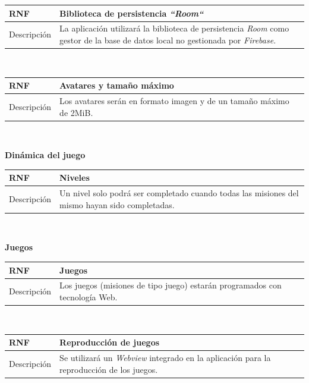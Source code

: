 \documentclass[twoside]{report}
\newcommand\addrow[2]{#1 &#2\\ }
\newcommand\addheading[2]{#1 &#2\\ \hline}
\newcommand\tabularhead{\begin{tabular}{lp{0.7\textwidth}}
\hline
}
\newenvironment{req}{\tabularhead}
{\hline\end{tabular}}
\begin{document}
\vspace{0.25cm}

\begin{req}
	\addheading{\textbf{RNF\arabic{nonFunctionalRequirements}}}{Biblioteca de persistencia \textit{“Room“}}
	\addrow{Descripción}{La aplicación utilizará la biblioteca de persistencia \textit{Room} \cite{roompersistence} como gestor de la base de datos local no gestionada por \textit{Firebase}.}
\end{req}\\

\begin{req}
	\addheading{\textbf{RNF\arabic{nonFunctionalRequirements}}}{Avatares y tamaño máximo}
	\addrow{Descripción}{Los avatares serán en formato imagen y de un tamaño máximo de 2MiB.}
\end{req}\\

\vspace{1cm}


\textbf{Dinámica del juego}

\begin{req}
	\addheading{\textbf{RNF\arabic{nonFunctionalRequirements}}}{Niveles}
	\addrow{Descripción}{Un nivel solo podrá ser completado cuando todas las misiones del mismo hayan sido completadas.}
\end{req}\\

\vspace{1cm}

\textbf{Juegos}\\

\begin{req}
	\addheading{\textbf{RNF\arabic{nonFunctionalRequirements}}}{Juegos}
	\addrow{Descripción}{Los juegos (misiones de tipo juego) estarán programados con tecnología Web.}
\end{req}\\

\vspace{0.25cm}

\begin{req}
	\addheading{\textbf{RNF\arabic{nonFunctionalRequirements}}}{Reproducción de juegos}
	\addrow{Descripción}{Se utilizará un \textit{Webview} integrado en la aplicación para la reproducción de los juegos.}
\end{req}\\
\end{document}
